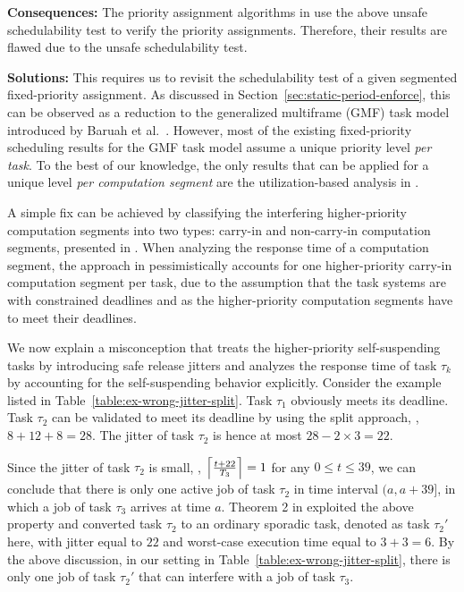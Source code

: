 {\bf Consequences:} The priority assignment algorithms in \cite{RTSS-KimANR13,DBLP:journals/ieicet/DingTT09} use the above unsafe schedulability test to verify the priority assignments. Therefore, their results are flawed due to the unsafe schedulability test.

{\bf Solutions:} This requires us to revisit the schedulability test of a given segmented fixed-priority assignment. As discussed in Section~\ref{sec:static-period-enforce}, this can be observed as a reduction to 
the generalized multiframe (GMF) task model introduced by Baruah et al.~\cite{baruah1999generalized}. However, most of the existing fixed-priority scheduling results for the GMF task model assume a unique priority level \emph{per task}. To the best of our knowledge, the only results that can be applied for a unique level \emph{per computation segment} are the utilization-based analysis in \cite{DBLP:journals/corr/ChenHL15b,huang2015mode}. 

A simple fix can be achieved by classifying the interfering
higher-priority computation segments into two types: carry-in and
non-carry-in computation segments, presented in \cite{Kim2016}.  When
analyzing the response time of a computation segment, the approach in \cite{Kim2016}
pessimistically accounts for one higher-priority carry-in computation
segment per task, due to the assumption that the task systems are with
constrained deadlines and as the higher-priority computation segments
have to meet their deadlines.




\label{sec:wrong-jitter-convert-sporadic}


We now explain a misconception that treats the higher-priority
self-suspending tasks by introducing safe release jitters and analyzes
the response time of task $\tau_k$ by accounting for the self-suspending behavior explicitly.  Consider
the example listed in Table~\ref{table:ex-wrong-jitter-split}.  Task
$\tau_1$ obviously meets its deadline.  Task $\tau_2$ can be validated
to meet its deadline by using the split approach, \ie, $8 + 12+ 8 =
28$. The jitter of task $\tau_2$ is hence at most $28-2\times 3 = 22$.

Since the jitter of task $\tau_2$ is small, \ie,
$\left\lceil{\frac{t+22}{T_3}}\right\rceil = 1$ for any $0 \leq t \leq 39$, we can
conclude that there is only one active job of task $\tau_2$ in time
interval $(a, a+39]$, in which a job of task $\tau_3$ arrives at time
$a$. Theorem 2 in \cite{ecrts15nelissen} exploited the above property
and converted task $\tau_2$ to an ordinary sporadic task, denoted as
task $\tau_2'$ here, with jitter equal to $22$ and worst-case
execution time equal to $3+3=6$. By the above
discussion, in our setting in Table~\ref{table:ex-wrong-jitter-split},
there is only one job of task $\tau_2'$ that can interfere with a job
of task $\tau_3$.

